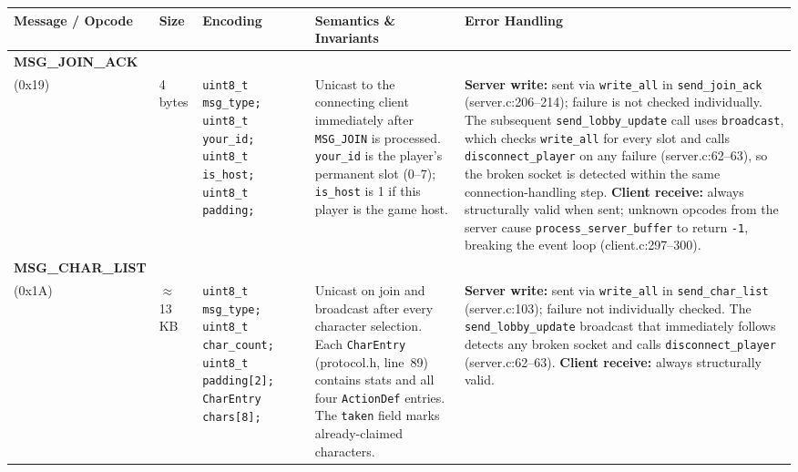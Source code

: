 \documentclass[11pt,letterpaper]{article}
\begin{document}
\begingroup
\small
\begin{longtable}{@{}p{1.8cm} p{1.2cm} p{2.4cm} p{4.2cm} p{4.8cm}@{}}
\toprule
\textbf{Message / Opcode} & \textbf{Size} & \textbf{Encoding} & \textbf{Semantics \& Invariants} & \textbf{Error Handling} \\
\midrule\endhead

\textbf{MSG\_JOIN\_ACK}\\(0x19) &
4 bytes &
\texttt{uint8\_t msg\_type;}\newline
\texttt{uint8\_t your\_id;}\newline
\texttt{uint8\_t is\_host;}\newline
\texttt{uint8\_t padding;} &
Unicast to the connecting client immediately after \texttt{MSG\_JOIN} is processed. \texttt{your\_id} is the player's permanent slot (0--7); \texttt{is\_host} is 1 if this player is the game host. &
\textbf{Server write:} sent via \texttt{write\_all} in \texttt{send\_join\_ack} (server.c:206--214); failure is not checked individually. The subsequent \texttt{send\_lobby\_update} call uses \texttt{broadcast}, which checks \texttt{write\_all} for every slot and calls \texttt{disconnect\_player} on any failure (server.c:62--63), so the broken socket is detected within the same connection-handling step. \textbf{Client receive:} always structurally valid when sent; unknown opcodes from the server cause \texttt{process\_server\_buffer} to return \texttt{-1}, breaking the event loop (client.c:297--300). \\[4pt]

\textbf{MSG\_CHAR\_LIST}\\(0x1A) &
$\approx$13\,KB &
\texttt{uint8\_t msg\_type;}\newline
\texttt{uint8\_t char\_count;}\newline
\texttt{uint8\_t padding[2];}\newline
\texttt{CharEntry chars[8];} &
Unicast on join and broadcast after every character selection. Each \texttt{CharEntry} (protocol.h, line~89) contains stats and all four \texttt{ActionDef} entries. The \texttt{taken} field marks already-claimed characters. &
\textbf{Server write:} sent via \texttt{write\_all} in \texttt{send\_char\_list} (server.c:103); failure not individually checked. The \texttt{send\_lobby\_update} broadcast that immediately follows detects any broken socket and calls \texttt{disconnect\_player} (server.c:62--63). \textbf{Client receive:} always structurally valid. \\[4pt]


\end{longtable}
\end{document}
